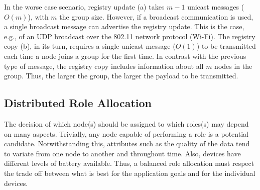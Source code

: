 In the worse case scenario, registry update (a) takes $m-1$ unicast messages ($O(m)$), with $m$ the group size. However, if a broadcast communication is used, a single broadcast message can advertise the registry update. This is the case, e.g., of an UDP broadcast over the 802.11 network protocol (Wi-Fi). The registry copy (b), in its turn, requires a single unicast message ($O(1)$) to be transmitted each time a node joins a group for the first time. In contrast with the previous type of message, the registry copy includes information about all $m$ nodes in the group. Thus, the larger the group, the larger the payload to be transmitted. 

 
\subsection{Distributed Role Allocation} 
 
The decision of which node(s) should be assigned to which roles(s) may depend on many aspects. Trivially, any node capable of performing a role is a potential candidate. Notwithstanding this, attributes such as the quality of the data tend to variate from one node to another and throughout time. Also, devices have different levels of battery available. Thus, a balanced role allocation must respect the trade off between what is best for the application goals and for the individual devices. 

%
%	
%	
%	


